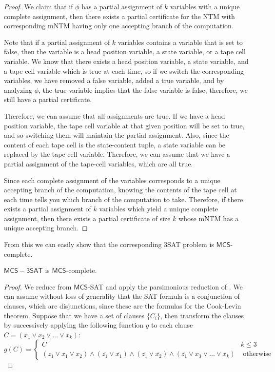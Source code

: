 \documentclass[runningheads,a4paper]{llncs}
\begin{document}
\begin{definition}
\begin{proof}
We claim that if $\phi$ has a partial assignment of $k$ variables with a unique complete assignment, then there exists a partial certificate for the NTM with corresponding mNTM having only one accepting branch of the computation.

Note that if a partial assignment of $k$ variables contains a variable that is set to false, then the variable is a head position variable, a state variable, or a tape cell variable. We know that there exists a head position variable, a state variable, and a tape cell variable which is true at each time, so if we switch the corresponding variables, we have removed a false variable, added a true variable, and by analyzing $\phi$, the true variable implies that the false variable is false, therefore, we still have a partial certificate. 

Therefore, we can assume that all assignments are true. If we have a head position variable, the tape cell variable at that given position will be set to true, and so switching them will maintain the partial assignment. Also, since the content of each tape cell is the state-content tuple, a state variable can be replaced by the tape cell variable. Therefore, we can assume that we have a partial assignment of the tape-cell variables, which are all true. 

Since each complete assignment of the variables corresponds to a unique accepting branch of the computation, knowing the contents of the tape cell at each time tells you which branch of the computation to take. Therefore, if there exists a partial assignment of $k$ variables which yield a unique complete assignment, then there exists a partial certificate of size $k$ whose mNTM has a unique accepting branch.
\end{proof}

From this we can easily show that the corresponding 3SAT problem is $\mathsf{MCS}$-complete.

\begin{theorem}
$\mathsf{MCS-3SAT}$ is $\mathsf{MCS}$-complete.
\end{theorem}

\begin{proof}
We reduce from $\mathsf{MCS}$-SAT and apply the parsimonious reduction of \cite{yaleclass}. We can assume without loss of generality that the SAT formula is a conjunction of clauses, which are disjunctions, since these are the formulas for the Cook-Levin theorem. Suppose that we have a set of clauses $\{ C_i \}$, then transform the clauses by successively applying the following function $g$ to each clause $C = (x_1 \vee x_2 \vee ... \vee x_k)$:
\[ g(C) = \left\{ \begin{array}{cc} C & k \leq 3 \\
						    (z_1 \vee x_1 \vee x_2) \wedge (\overline{z_1} \vee \overline{x_1}) \wedge (\overline{z_1} \vee \overline{x_2}) \wedge (\overline{z_1} \vee x_3 \vee ... \vee x_k) & \text{ otherwise }\end{array} \right. \] 


\end{proof}
\end{definition}
\end{document}
